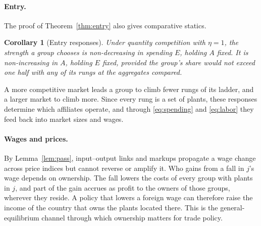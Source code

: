 \documentclass[11pt]{article}
\newtheorem{corollary}{Corollary}
\theoremstyle{definition}
\theoremstyle{remark}
\begin{document}
\paragraph{Entry.} The proof of Theorem~\ref{thm:entry} also gives comparative statics.

\begin{corollary}[Entry responses]\label{cor:entry}
Under quantity competition with $\eta=1$, the strength a group chooses is
non-decreasing in spending $E$, holding $A$ fixed. It is non-increasing in $A$, holding
$E$ fixed, provided the group's share would not exceed one half with any of its rungs at
the aggregates compared.
\end{corollary}

\noindent A more competitive market leads a group to climb fewer rungs of its ladder,
and a larger market to climb more. Since every rung is a set of plants, these responses
determine which affiliates operate, and through \eqref{eq:spending} and \eqref{eq:labor}
they feed back into market sizes and wages.

\paragraph{Wages and prices.} By Lemma~\ref{lem:pass}, input--output links and markups
propagate a wage change across price indices but cannot reverse or amplify it. Who gains from a fall in $j$'s wage depends on ownership. The fall lowers
the costs of every group with plants in $j$, and part of the gain accrues as profit to
the owners of those groups, wherever they reside. A policy that lowers a foreign wage
can therefore raise the income of the country that owns the plants located there. This
is the general-equilibrium channel through which ownership matters for trade policy.
\end{document}
